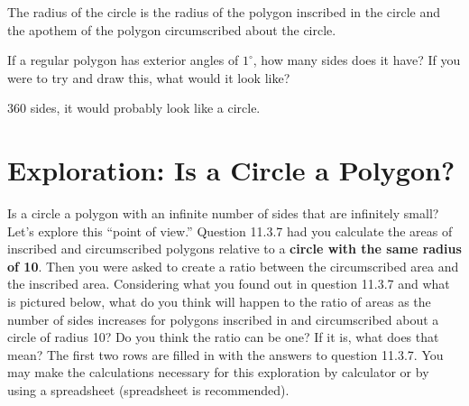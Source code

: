 \begin{exercises}
\begin{ex}
	\begin{sol}
	The radius of the circle is the radius of the polygon inscribed in the circle and the apothem of the polygon circumscribed about the circle.
	\end{sol}
	\end{ex}
	
	\medskip
	
	\begin{ex} \e If a regular polygon has exterior angles of $1^\circ$, how many sides does it have?  If you were to try and draw this, what would it look like?
	 
	\begin{sol}
	360 sides, it would probably look like a circle.
	\end{sol}
	\end{ex}
	
	\medskip
	
	
\end{exercises}

			\section{Exploration:  Is a Circle a Polygon?}

Is a circle a polygon with an infinite number of sides that are infinitely small?  Let's explore this ``point of view.'' Question 11.3.7 had you calculate the areas of inscribed and circumscribed polygons relative to a \textbf{circle with the same radius of 10}.  Then you were asked to create a ratio between the circumscribed area and the inscribed area.  Considering what you found out in question 11.3.7 and what is pictured below, what do you think will happen to the ratio of areas as the number of sides increases for polygons inscribed in and circumscribed about a circle of radius 10?  Do you think the ratio can be one?  If it is, what does that mean?  The first two rows are filled in with the answers to question 11.3.7.  You may make the calculations necessary for this exploration by calculator or by using a spreadsheet (spreadsheet is recommended).

